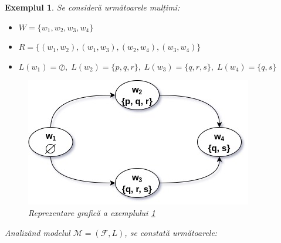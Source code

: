 \documentclass[12pt, openany]{book}
\newtheorem{example}[definition]{Exemplul} %
\begin{document}
            \begin{example}
            \label{ex_truth_sat}
                Se consideră următoarele mulțimi:
                \begin{itemize}
                    \item $W=\{w_1, w_2, w_3, w_4\}$
                    \item $R=\{(w_1, w_2), (w_1, w_3), (w_2, w_4), (w_3, w_4)\}$
                    \item $L(w_1)=\oslash,\; L(w_2)=\{p,q,r\},\; L(w_3)=\{q,r,s\},\; L(w_4)=\{q,s\}$
                \end{itemize}

                \begin{figure}[h!]
                \label{fig_example_1}
                    \includegraphics[width=0.5\linewidth]{images/example_1.jpg}
                    \centering
                    \caption{Reprezentare grafică a exemplului \ref{ex_truth_sat}}
                \end{figure}
                \vspace{101pt}
                
                Analizând modelul $\mathcal{M}=(\mathcal{F},L)$, se constată următoarele:
                

\end{example}
\end{document}
